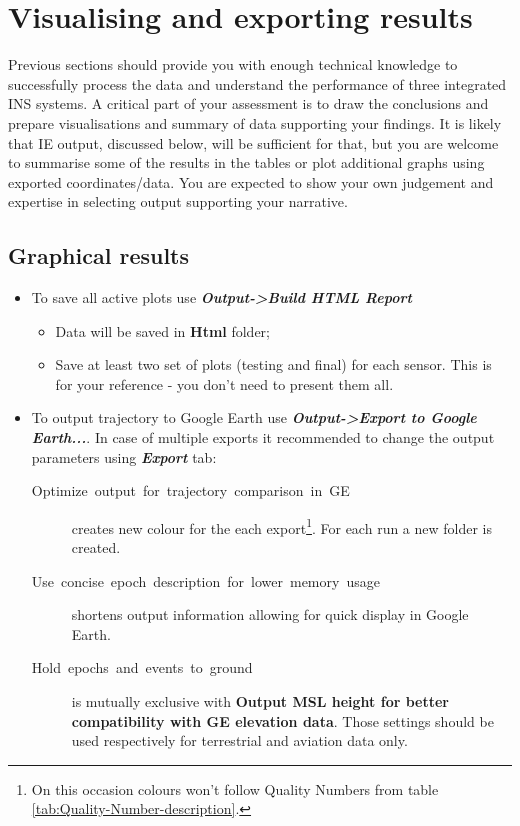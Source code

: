 \documentclass[11pt,fleqn]{book} %
\begin{document}
\chapter{Visualising and exporting  results\label{sec:Exporting-final-results}}

Previous sections should provide you with enough technical knowledge to successfully process the data and understand the performance of three integrated INS systems. A critical part of your assessment is to draw the conclusions and prepare visualisations and summary of data supporting your findings. It is likely that IE output, discussed below, will be sufficient for that, but you are welcome to summarise some of the results in the tables or plot additional graphs using exported coordinates/data. You are expected to show your own judgement and expertise in selecting output supporting your narrative.

\section{Graphical results}

\begin{itemize}
	\item To save all active plots use\textbf{\emph{ Output->Build HTML Report }}
	\begin{itemize}
		\item Data will be saved in \textbf{Html} folder;
		\item Save at least two set of plots (testing and final) for each sensor. This is for your reference - you don't need to present them all.
	\end{itemize}
	\item To output trajectory to Google Earth use\textbf{\emph{ Output->Export to Google Earth...}}. In case of multiple exports it recommended to change the output parameters using \textbf{\emph{Export}} tab:
	\begin{description}
		\item [{Optimize~output~for~trajectory~comparison~in~GE}] creates new colour for the each export\footnote{On this occasion colours won't follow Quality Numbers from table \ref{tab:Quality-Number-description}.}. For each run a new folder is created.
		\item [{Use~concise~epoch~description~for~lower~memory~usage}] shortens output information allowing for quick display in Google Earth.
		\item [Hold~epochs~and~events~to~ground] is mutually exclusive with \textbf{Output MSL height for better compatibility with GE elevation data}. Those settings should be used respectively for terrestrial and aviation data only.
	\end{description}
\end{itemize}
\end{document}
